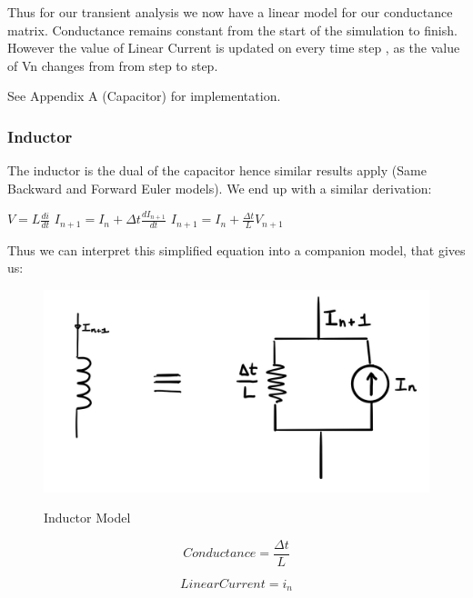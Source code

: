 \documentclass{article}
\begin{document}
Thus for our transient analysis we now have a linear model for our conductance matrix. Conductance remains constant from the start of the simulation to finish. However the value of Linear Current is updated on every time step , as the value of Vn changes from from step to step.

\bigbreak 

See Appendix A (Capacitor) for implementation.

\newpage
\subsubsection{Inductor}
The inductor is the dual of the capacitor hence similar results apply (Same Backward and Forward Euler models). We end up with a similar derivation:
\bigbreak

$V = L\frac{di}{dt}$
\medbreak
$I_{n+1} = I_n + \Delta t\frac{dI_{n+1}}{dt}$
\medbreak
$I_{n+1} = I_n + \frac{\Delta t}{L}V_{n+1}$

\bigbreak

Thus we can interpret this simplified equation into a companion model, that gives us: 

\bigbreak

\begin{figure}[h]
    \caption{Inductor Model}
    \centering
    \includegraphics[width=\textwidth]{images/InductorModel.jpg}
    \label{fig:InductorModel}
\end{figure}

\noindent\begin{minipage}{.5\linewidth}
\setcounter{equation}{0}
\begin{equation}
  Conductance = \frac{\Delta t}{L}
\end{equation}
\end{minipage}%
\begin{minipage}{.5\linewidth}
\begin{equation}
  LinearCurrent = i_n
\end{equation}
\end{minipage}
\end{document}
